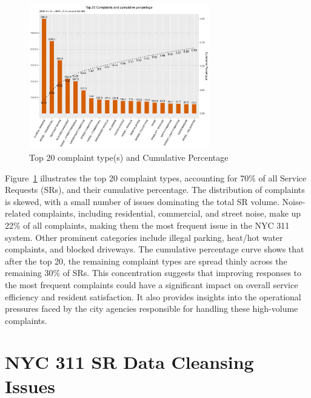 \documentclass[linenumber]{jdsart}
\begin{document}
\begin{figure}[tbp]
 \centering
  \includegraphics[width=0.7\textwidth]{SR_by_Complaint_Type.pdf} 
  \caption{Top 20 complaint type(s) and Cumulative Percentage} 
  \label{fig:SR_complaints}
\end{figure}

Figure~\ref{fig:SR_complaints}
illustrates the top 20 complaint types, accounting for 70\% 
of all Service Requests (SRs), and their cumulative percentage. The 
distribution of complaints is skewed, with a small number of issues 
dominating the total SR volume. Noise-related complaints, including 
residential, commercial, and street noise, make up 22\% of all 
complaints, making them the most frequent issue in the NYC 311 system. 
Other prominent categories include illegal parking, heat/hot water 
complaints, and blocked driveways. The cumulative percentage curve 
shows that after the top 20, the remaining complaint types are spread 
thinly across the remaining 30\% of SRs. This concentration suggests 
that improving responses to the most frequent complaints could have 
a significant impact on overall service efficiency and resident 
satisfaction. It also provides insights into the operational 
pressures faced by the city agencies responsible for handling these 
high-volume complaints.


\section{NYC 311 SR Data Cleansing Issues} 
\label{sec:issues}
\end{document}

